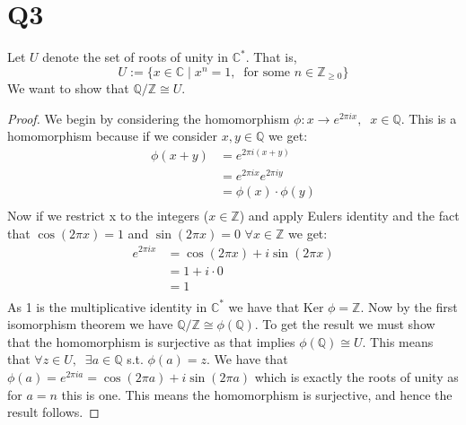\documentclass{article}
\begin{document}
\section*{Q3}
Let $U$ denote the set of roots of unity in $\mathbb{C}^*$. That is,
$$U:=\{x\in\mathbb{C}\;|\;x^n=1,\;\;\text{for some }n\in\mathbb{Z}_{\geq0}\}$$
We want to show that $\mathbb{Q}/\mathbb{Z}\cong U$.
\begin{proof}
We begin by considering the homomorphism $\phi:x\rightarrow e^{2\pi ix}, \;\;x\in\mathbb{Q}$. This is a homomorphism because if we consider $x,y\in\mathbb{Q}$ we get:
\begin{align*}
\phi(x+y)&=e^{2\pi i(x+y)}\\
&=e^{2\pi ix}e^{2\pi iy}\\
&=\phi(x)\cdot\phi(y)\\
\end{align*}
Now if we restrict x to the integers ($x\in\mathbb{Z}$) and apply Eulers identity and the fact that $\cos(2\pi x)=1$ and $\sin(2\pi x)=0$ $\forall x\in\mathbb{Z}$ we get:
\begin{align*}
e^{2\pi ix}&=\cos(2\pi x)+i\sin(2\pi x)\\
&=1+i\cdot0\\
&=1\\
\end{align*}
As 1 is the multiplicative identity in $\mathbb{C}^*$ we have that $\text{Ker }\phi=\mathbb{Z}$. Now by the first isomorphism theorem we have $\mathbb{Q}/\mathbb{Z}\cong \phi(\mathbb{Q})$. To get the result we must show that the homomorphism is surjective as that implies $\phi(\mathbb{Q})\cong U$. This means that $\forall z\in U,\;\;\exists a\in\mathbb{Q}$ s.t. $\phi\left(a\right)=z$. We have that $\phi(a)=e^{2\pi i a}=\cos(2\pi a)+i\sin(2\pi a)$ which is exactly the roots of unity as for $a=n$ this is one. This means the homomorphism is surjective, and hence the result follows.
\end{proof}
\end{document}
